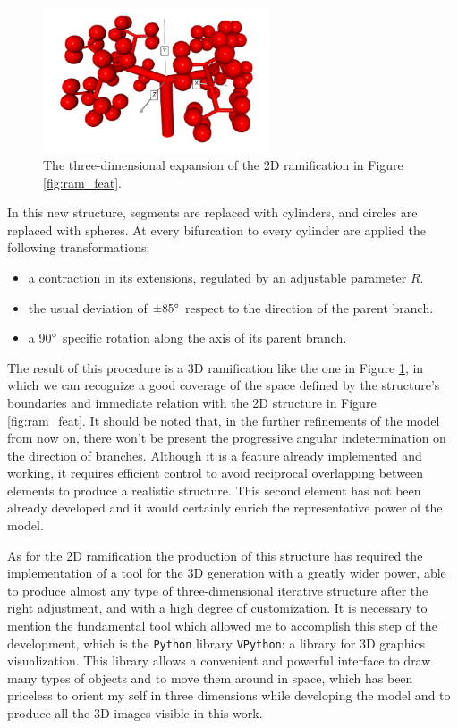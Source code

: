     \begin{figure}
        \centering
        \includegraphics[width = 0.6\textwidth]{images/3d_ram}
        \caption{The three-dimensional expansion of the 2D ramification in Figure \ref{fig:ram_feat}.}
        \label{fig:3d_ram}
    \end{figure}

    In this new structure, segments are replaced with cylinders, and circles are replaced with spheres. At every bifurcation to every cylinder are applied the following transformations:
    \begin{itemize}
        \item a contraction in its extensions, regulated by an adjustable parameter $R$.
        \item the usual deviation of $\pm 85 \degree$ respect to the direction of the parent branch.
        \item a 90$\degree$ specific rotation along the axis of its parent branch.
    \end{itemize}

    The result of this procedure is a 3D ramification like the one in Figure \ref{fig:3d_ram}, in which we can recognize a good coverage of the space defined by the structure's boundaries and immediate relation with the 2D structure in Figure \ref{fig:ram_feat}. It should be noted that, in the further refinements of the model from now on, there won't be present the progressive angular indetermination on the direction of branches. Although it is a feature already implemented and working, it requires efficient control to avoid reciprocal overlapping between elements to produce a realistic structure. This second element has not been already developed and it would certainly enrich the representative power of the model.

    As for the 2D ramification the production of this structure has required the implementation of a tool for the 3D generation with a greatly wider power, able to produce almost any type of three-dimensional iterative structure after the right adjustment, and with a high degree of customization. It is necessary to mention the fundamental tool which allowed me to accomplish this step of the development, which is the \texttt{Python} library \texttt{VPython}: a library for 3D graphics visualization. This library allows a convenient and powerful interface to draw many types of objects and to move them around in space, which has been priceless to orient my self in three dimensions while developing the model and to produce all the 3D images visible in this work.

